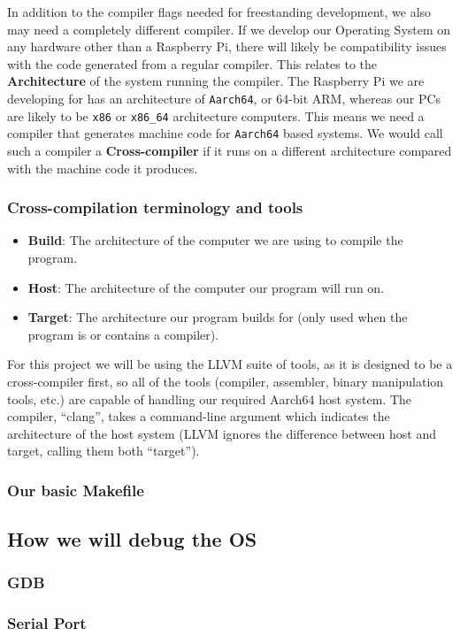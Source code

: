 \documentclass{article}
\begin{document}
In addition to the compiler flags needed for freestanding development, we also
may need a completely different compiler. If we develop our Operating System on
any hardware other than a Raspberry Pi, there will likely be compatibility
issues with the code generated from a regular compiler. This relates to the
\textbf{Architecture} of the system running the compiler. The Raspberry Pi we
are developing for has an architecture of \texttt{Aarch64}, or 64-bit ARM,
whereas our PCs are likely to be \texttt{x86} or \texttt{x86\_64} architecture
computers. This means we need a compiler that generates machine code for
\texttt{Aarch64} based systems. We would call such a compiler a
\textbf{Cross-compiler} if it runs on a different architecture compared with
the machine code it produces.
\subsubsection{Cross-compilation terminology and tools}
\begin{itemize}
    \item \textbf{Build}: The architecture of the computer we are using to
        compile the program.
    \item \textbf{Host}: The architecture of the computer our program will run
        on.
    \item \textbf{Target}: The architecture our program builds for (only used
        when the program is or contains a compiler).
\end{itemize}
For this project we will be using the LLVM suite of tools, as it is designed to
be a cross-compiler first, so all of the tools (compiler, assembler, binary
manipulation tools, etc.) are capable of handling our required Aarch64 host
system. The compiler, ``clang'', takes a command-line argument which indicates
the architecture of the host system (LLVM ignores the difference between host
and target, calling them both ``target'').
\subsubsection{Our basic Makefile}
\subsection{How we will debug the OS}
\subsubsection{GDB}
\subsubsection{Serial Port}
\end{document}
